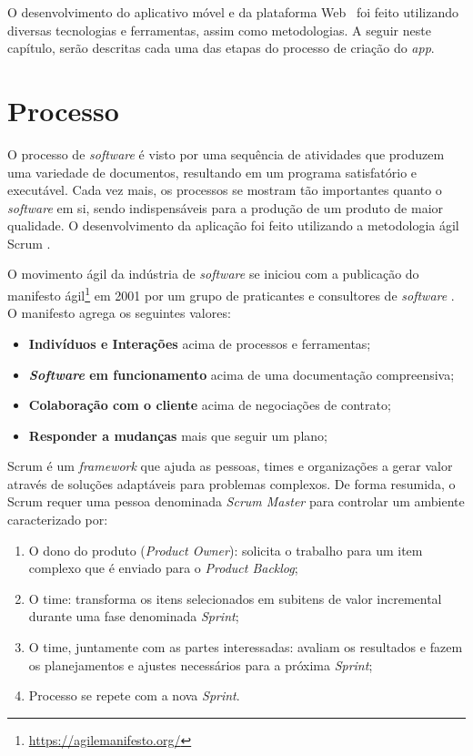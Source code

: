 O desenvolvimento do aplicativo móvel e da plataforma Web \appName\ foi feito utilizando diversas tecnologias e ferramentas, assim como metodologias. A seguir neste capítulo, serão descritas cada uma das etapas do processo de criação do \textit{app}.

\section{Processo}

O processo de \textit{software} \cite{processos_software} é visto por uma sequência de atividades que produzem uma variedade de documentos, resultando em um programa satisfatório e executável. Cada vez mais, os processos se mostram tão importantes quanto o \textit{software} em si, sendo indispensáveis para a produção de um produto de maior qualidade. O desenvolvimento da aplicação foi feito utilizando a metodologia ágil Scrum \cite{scrum_guide}.

O movimento ágil da indústria de \textit{software} \cite{agile_software_development} se iniciou com a publicação do manifesto ágil\footnote{\url{https://agilemanifesto.org/}} em 2001 por um grupo de praticantes e consultores de \textit{software} . O manifesto agrega os seguintes valores:

\begin{itemize}
    \item \textbf{Indivíduos e Interações} acima de processos e ferramentas;
    \item \textbf{\textit{Software} em funcionamento} acima de uma documentação compreensiva;
    \item \textbf{Colaboração com o cliente} acima de negociações de contrato;
    \item \textbf{Responder a mudanças} mais que seguir um plano;
\end{itemize}

Scrum \cite{scrum_guide} é um \textit{framework} que ajuda as pessoas, times e organizações a gerar valor através de soluções adaptáveis para problemas complexos. De forma resumida, o Scrum requer uma pessoa denominada \textit{Scrum Master} para controlar um ambiente caracterizado por:

\begin{enumerate}
    \item O dono do produto (\textit{Product Owner}): solicita o trabalho para um item complexo que é enviado para o \textit{Product Backlog};
    \item O time: transforma os itens selecionados em subitens de valor incremental durante uma fase denominada \textit{Sprint};
    \item O time, juntamente com as partes interessadas: avaliam os resultados e fazem os planejamentos e ajustes necessários para a próxima \textit{Sprint};
    \item Processo se repete com a nova \textit{Sprint}.
\end{enumerate}

